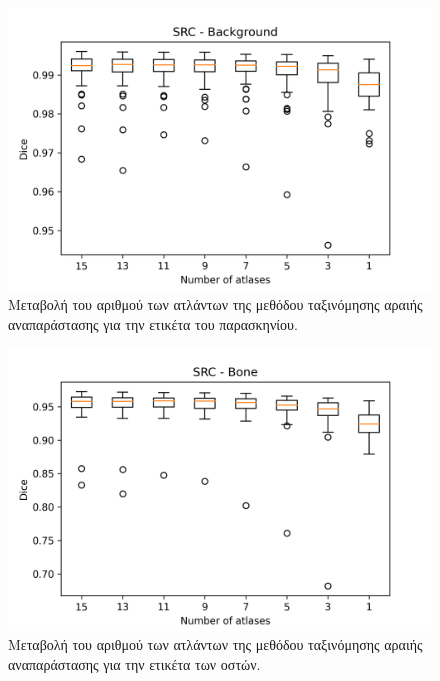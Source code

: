 \documentclass[a4paper,12pt]{article}
\begin{document}
\begin{figure}[H]
    \centering
    \includegraphics[width=0.85\linewidth]{SRC_Number_of_atlases_Background_plot.png}
    \caption{Μεταβολή του αριθμού των ατλάντων της μεθόδου ταξινόμησης αραιής
             αναπαράστασης για την ετικέτα του παρασκηνίου.}
    \label{fig:SRC:atlases:1}
\end{figure}

\begin{figure}[H]
    \centering
    \includegraphics[width=0.85\linewidth]{SRC_Number_of_atlases_Bone_plot.png}
    \caption{Μεταβολή του αριθμού των ατλάντων της μεθόδου ταξινόμησης αραιής
             αναπαράστασης για την ετικέτα των οστών.}
    \label{fig:SRC:atlases:2}
\end{figure}
\end{document}
